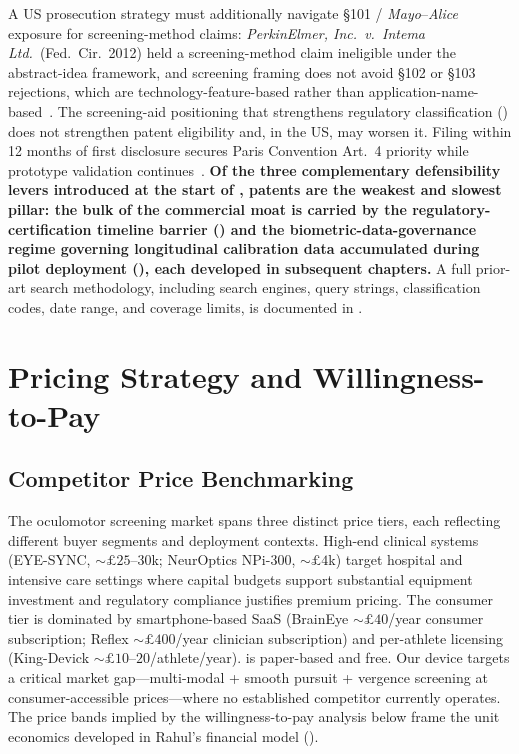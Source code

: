 A US prosecution strategy must additionally navigate \S101 / \emph{Mayo}--\emph{Alice} exposure for screening-method claims: \emph{PerkinElmer, Inc.\ v.\ Intema Ltd.}~(Fed.\ Cir.\ 2012) held a screening-method claim ineligible under the abstract-idea framework, and screening framing does not avoid \S102 or \S103 rejections, which are technology-feature-based rather than application-name-based~\cite{perkinelmerintema2012}. The screening-aid positioning that strengthens regulatory classification () does not strengthen patent eligibility and, in the US, may worsen it. Filing within 12 months of first disclosure secures Paris Convention Art.~4 priority while prototype validation continues~\cite{pariscv1883}. \textbf{Of the three complementary defensibility levers introduced at the start of , patents are the weakest and slowest pillar: the bulk of the commercial moat is carried by the regulatory-certification timeline barrier () and the biometric-data-governance regime governing longitudinal calibration data accumulated during pilot deployment (), each developed in subsequent chapters.} A full prior-art search methodology, including search engines, query strings, classification codes, date range, and coverage limits, is documented in .




\section{Pricing Strategy and Willingness-to-Pay}
\label{sec:ent-pricing-strategy-victor}


\subsection{Competitor Price Benchmarking}
\label{sec:ent-price-benchmarking}

The oculomotor screening market spans three distinct price tiers, each reflecting different buyer segments and deployment contexts. High-end clinical systems (EYE-SYNC, ${\sim}\pounds 25$--$30$k; NeurOptics NPi-300, ${\sim}\pounds 4$k) target hospital and intensive care settings where capital budgets support substantial equipment investment and regulatory compliance justifies premium pricing. The consumer tier is dominated by smartphone-based SaaS (BrainEye ${\sim}\pounds 40$/year consumer subscription; Reflex ${\sim}\pounds 400$/year clinician subscription) and per-athlete licensing (King-Devick ${\sim}\pounds 10$--$20$/athlete/year).  is paper-based and free. Our device targets a critical market gap---multi-modal  + smooth pursuit + vergence screening at consumer-accessible prices---where no established competitor currently operates. The price bands implied by the willingness-to-pay analysis below frame the unit economics developed in Rahul's financial model ().

